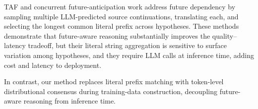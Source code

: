 TAF and concurrent future-anticipation work
\citep{ouyang2024anticipating} address future dependency by sampling
multiple LLM-predicted source continuations, translating each, and
selecting the longest common literal prefix across hypotheses. These
methods demonstrate that future-aware reasoning substantially improves
the quality--latency tradeoff, but their literal string aggregation is
sensitive to surface variation among hypotheses, and they require LLM
calls at inference time, adding cost and latency to deployment.

In contrast, our method replaces literal prefix matching with token-level distributional consensus during training-data construction, decoupling future-aware reasoning from inference time.
